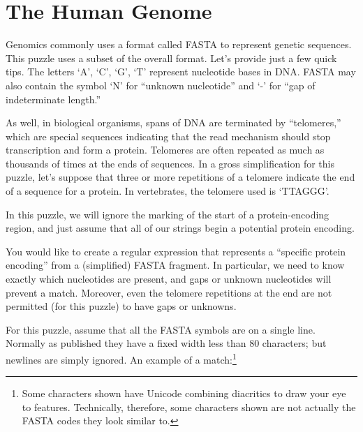 \newpage

\hypertarget{the-human-genome}{%
\section{The Human Genome}\label{the-human-genome}}

Genomics commonly uses a format called FASTA to represent genetic
sequences. This puzzle uses a subset of the overall format. Let's
provide just a few quick tips. The letters `A', `C', `G', `T' represent
nucleotide bases in DNA. FASTA may also contain the symbol `N' for
``unknown nucleotide'' and `-' for ``gap of indeterminate length.''

As well, in biological organisms, spans of DNA are terminated by
``telomeres,'' which are special sequences indicating that the read
mechanism should stop transcription and form a protein. Telomeres are
often repeated as much as thousands of times at the ends of sequences.
In a gross simplification for this puzzle, let's suppose that three or
more repetitions of a telomere indicate the end of a sequence for a
protein. In vertebrates, the telomere used is `TTAGGG'.

In this puzzle, we will ignore the marking of the start of a
protein-encoding region, and just assume that all of our strings begin a
potential protein encoding.

You would like to create a regular expression that represents a
``specific protein encoding'' from a (simplified) FASTA fragment. In
particular, we need to know exactly which nucleotides are present, and
gaps or unknown nucleotides will prevent a match. Moreover, even the
telomere repetitions at the end are not permitted (for this puzzle) to
have gaps or unknowns.

For this puzzle, assume that all the FASTA symbols are on a single line.
Normally as published they have a fixed width less than 80 characters;
but newlines are simply ignored. An example of a match:\footnote{Some
  characters shown have Unicode combining diacritics to draw your eye to
  features. Technically, therefore, some characters shown are not
  actually the FASTA codes they look similar to.}

\begin{Shaded}
\begin{Highlighting}[]
\OperatorTok{\textgreater{}\textgreater{}\textgreater{}} 
\OperatorTok{\textgreater{}\textgreater{}\textgreater{}} \NormalTok{(}\StringTok{\textquotesingle{}}\StringTok{\textquotesingle{}}\NormalTok{)))}
\end{Highlighting}
\end{Shaded}

